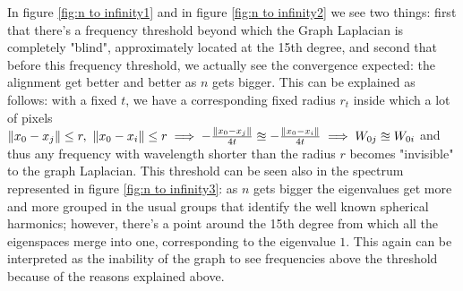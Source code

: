 In figure \ref{fig:n to infinity1} and in figure \ref{fig:n to infinity2} we see two things: first that there's a frequency threshold beyond which the Graph Laplacian is completely "blind", approximately located at the 15th degree, and second that before this frequency threshold, we actually see the convergence expected: the alignment get better and better as $n$ gets bigger. This can be explained as follows: with a fixed $t$, we have a corresponding fixed radius $r_t$ inside which a lot of pixels $\left\lVert x_0-x_j\right\rVert\leq r,\ \left\lVert x_0-x_i\right\rVert\leq r \implies -\frac{\left\lVert x_0-x_j\right\rVert}{4t} \approxeq -\frac{\left\lVert x_0-x_i\right\rVert}{4t} \implies W_{0j}\approxeq W_{0i}$ and thus any frequency with wavelength shorter than the radius $r$ becomes "invisible" to the graph Laplacian. This threshold can be seen also in the spectrum represented in figure \ref{fig:n to infinity3}: as $n$ gets bigger the eigenvalues get more and more grouped in the usual groups that identify the well known spherical harmonics; however, there's a point around the 15th degree  from which all the eigenspaces merge into one, corresponding to the eigenvalue $1$. This again can be interpreted as the inability of the graph to see frequencies above the threshold because of the reasons explained above.
 
